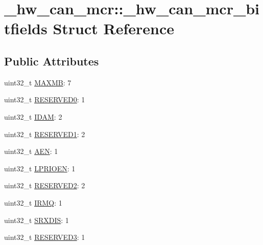 \hypertarget{struct__hw__can__mcr_1_1__hw__can__mcr__bitfields}{}\section{\+\_\+hw\+\_\+can\+\_\+mcr\+:\+:\+\_\+hw\+\_\+can\+\_\+mcr\+\_\+bitfields Struct Reference}
\label{struct__hw__can__mcr_1_1__hw__can__mcr__bitfields}
\subsection*{Public Attributes}
\begin{DoxyCompactItemize}
\item 
uint32\+\_\+t \hyperlink{struct__hw__can__mcr_1_1__hw__can__mcr__bitfields_a019aeb3605c5a37310850407d2ce8fde}{M\+A\+X\+MB}\+: 7
\item 
uint32\+\_\+t \hyperlink{struct__hw__can__mcr_1_1__hw__can__mcr__bitfields_ace4dfe5a40a235f7e66f8046132958b5}{R\+E\+S\+E\+R\+V\+E\+D0}\+: 1
\item 
uint32\+\_\+t \hyperlink{struct__hw__can__mcr_1_1__hw__can__mcr__bitfields_a474574c23c5b40469930b9d1a26a8cf9}{I\+D\+AM}\+: 2
\item 
uint32\+\_\+t \hyperlink{struct__hw__can__mcr_1_1__hw__can__mcr__bitfields_aaa3a4a4ec3527bf4a62c761af38ec71a}{R\+E\+S\+E\+R\+V\+E\+D1}\+: 2
\item 
uint32\+\_\+t \hyperlink{struct__hw__can__mcr_1_1__hw__can__mcr__bitfields_aab69ff8ae7853c48a2f3ea15ea535a2e}{A\+EN}\+: 1
\item 
uint32\+\_\+t \hyperlink{struct__hw__can__mcr_1_1__hw__can__mcr__bitfields_ad271c1c0c659754699f7aa3095dff89b}{L\+P\+R\+I\+O\+EN}\+: 1
\item 
uint32\+\_\+t \hyperlink{struct__hw__can__mcr_1_1__hw__can__mcr__bitfields_a5daab44817b6174ecf02ae820cdebf7f}{R\+E\+S\+E\+R\+V\+E\+D2}\+: 2
\item 
uint32\+\_\+t \hyperlink{struct__hw__can__mcr_1_1__hw__can__mcr__bitfields_ad96fbf9313f3d14cebc03c341bb3b047}{I\+R\+MQ}\+: 1
\item 
uint32\+\_\+t \hyperlink{struct__hw__can__mcr_1_1__hw__can__mcr__bitfields_ae02aee58d932c8bddca24b4a4e099f99}{S\+R\+X\+D\+IS}\+: 1
\item 
uint32\+\_\+t \hyperlink{struct__hw__can__mcr_1_1__hw__can__mcr__bitfields_adf7601da94f17373fa8dd900b5fe0d4d}{R\+E\+S\+E\+R\+V\+E\+D3}\+: 1
\item 

\end{DoxyCompactItemize}
